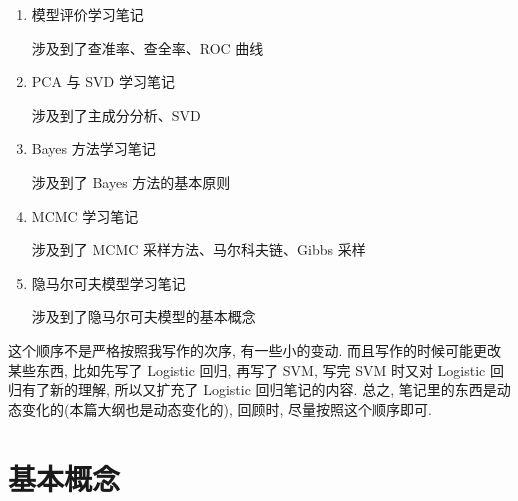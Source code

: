 \documentclass[a4paper,UTF8]{ctexart}
\theoremstyle{plain} \newtheorem{theorem}{定理}[section]
\theoremstyle{plain} \newtheorem{definition}{定义}[section]
\theoremstyle{plain} \newtheorem{lemma}{引理}[section]
\theoremstyle{plain} \newtheorem{proposition}{命题}[section]
\theoremstyle{plain} \newtheorem{example}{例}[section]
\theoremstyle{plain} \newtheorem{remark}{注}[section]
\theoremstyle{plain} \newtheorem{corollary}{推论}[section]
\begin{document}
\begin{enumerate}[(1)]
\item {\color{red} 模型评价学习笔记}

涉及到了查准率、查全率、ROC 曲线

\item {\color{red} PCA 与 SVD 学习笔记}

涉及到了主成分分析、SVD

\item {\color{red} Bayes 方法学习笔记}

涉及到了 Bayes 方法的基本原则

\item {\color{red} MCMC 学习笔记}

涉及到了 MCMC 采样方法、马尔科夫链、Gibbs 采样

\item {\color{red} 隐马尔可夫模型学习笔记}

涉及到了隐马尔可夫模型的基本概念

\end{enumerate}

这个顺序不是严格按照我写作的次序, 有一些小的变动. 而且写作的时候可能更改某些东西, 比如先写了 Logistic 回归, 再写了 SVM, 写完 SVM 时又对 Logistic 回归有了新的理解, 所以又扩充了 Logistic 回归笔记的内容. 总之, 笔记里的东西是动态变化的(本篇大纲也是动态变化的), 回顾时, 尽量按照这个顺序即可.



\section{基本概念}
\end{document}
